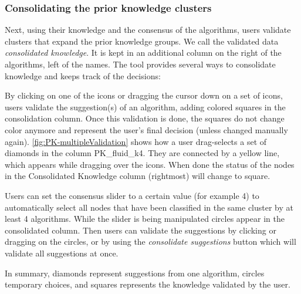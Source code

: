 \subsubsection{Consolidating the prior knowledge clusters}
\label{sec:validating-pk}

Next, using their knowledge and the consensus of the algorithms, users validate clusters that expand the prior knowledge groups. We call the validated data \emph{consolidated knowledge}. It is kept in an additional column on the right of the algorithms, left of the names. The tool provides several ways to consolidate knowledge and keeps track of the decisions:


\begin{description}[leftmargin=0pt,nosep]

\item [Partial Copy.] By clicking on one of the icons or dragging the cursor down on a set of icons, users validate the suggestion(s) of an algorithm, adding colored squares in the consolidation column. Once this validation is done, the squares do not change color anymore and represent the user's final decision (unless changed manually again). \autoref{fig:PK-multipleValidation} shows how a user drag-selects a set of diamonds in the column PK\_fluid\_k4. They are connected by a yellow line, which appears while dragging over the icons.
When done the status of the nodes in the Consolidated Knowledge column (rightmost) will change to square.

\item [Consensus slider.] Users can set the consensus slider to a certain value (for example 4) to automatically select all nodes that have been classified in the same cluster by at least 4 algorithms. While the slider is being manipulated circles appear in the consolidated column.  Then users can validate the suggestions by clicking or dragging on the circles, or by using the \emph{consolidate suggestions} button which will validate all suggestions at once.
\item In summary, diamonds represent suggestions from one algorithm, circles temporary choices, and squares represents the knowledge validated by the user.








\end{description}
